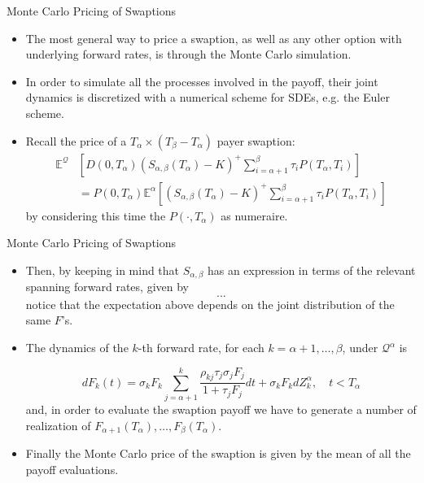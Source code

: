 \documentclass{beamer}
\begin{document}
\begin{frame}{Monte Carlo Pricing of Swaptions}
  \begin{itemize}
  \item The most general way to price a swaption, as well as any other option with underlying forward rates, is through the Monte Carlo simulation. 
  \item In order to simulate all the processes involved in the payoff, their joint dynamics is discretized with a numerical scheme for SDEs, e.g. the Euler scheme.
  \item Recall the price of a $T_\alpha\times(T_\beta - T_\alpha)$ payer swaption:
    \begin{equation*}
      \begin{aligned}
        \mathbb{E}^\mathcal{Q}&\left[D(0, T_\alpha) (S_{\alpha,\beta}(T_\alpha) - K)^+ \sum_{i=\alpha+1}^\beta \tau_i P(T_\alpha, T_i)\right] \\
        &= P(0, T_\alpha)\mathbb{E}^\alpha\left[(S_{\alpha, \beta}(T_\alpha) - K)^+ \sum^\beta_{i=\alpha+1} \tau_i P(T_\alpha, T_i)\right]
      \end{aligned}
    \end{equation*}
    by considering this time the $P(\cdot, T_\alpha)$ as numeraire.
  \end{itemize}
\end{frame}

\begin{frame}{Monte Carlo Pricing of Swaptions}
  \begin{itemize}
  \item Then, by keeping in mind that $S_{\alpha,\beta}$ has an expression in terms of the relevant spanning forward rates, given by
    \begin{equation*}
      ...
    \end{equation*}
    notice that the expectation above depends on the joint distribution of the same $F$’s.
  \item The dynamics of the $k$-th forward rate, for each $k = \alpha + 1,\ldots, \beta$, under $\mathcal{Q}^\alpha$ is
    
\begin{equation}
  dF_k(t) = \sigma_kF_k\sum_{j=\alpha+1}^k\frac{\rho_{kj}\tau_j\sigma_jF_j}{1+\tau_jF_j}dt+\sigma_kF_k dZ^\alpha_k, \quad t<T_\alpha
  \label{eq:dynamics_4.1}
\end{equation}
and, in order to evaluate the swaption payoff we have to generate a number of realization of $F_{\alpha+1}(T_\alpha),\ldots, F_\beta(T_\alpha)$. 
\item Finally the Monte Carlo price of the swaption is given by the mean of all the payoff evaluations.
  \end{itemize}
\end{frame}
\end{document}
